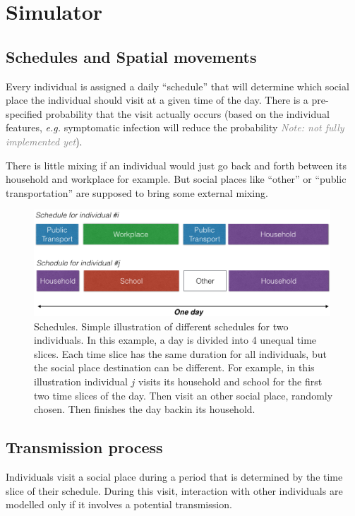 \documentclass[11pt, onecolumn]{article}
\newcommand{\note}[1]{\textit{\textcolor{Grey}{Note: #1}}}
\newcommand{\eg}{\textit{e.g.}\xspace}
\begin{document}
\section{Simulator}

\subsection{Schedules and Spatial movements}

Every individual is assigned a daily ``schedule'' that will determine which social place the individual should visit at a given time of the day. There is a pre-specified probability that the visit actually occurs (based on the individual features, \eg symptomatic infection will reduce the probability \note{not fully implemented yet}).

There is little mixing if an individual would just go back and forth between its household and workplace for example. But social places like ``other'' or ``public transportation'' are supposed to bring some external mixing.


\begin{figure}[!ht]
\centering
    \includegraphics[angle=0,width=0.99\textwidth]{figures/schedule.png}
\caption{Schedules. Simple illustration of different schedules for two individuals. In this example, a day is divided into 4 unequal time slices. Each time slice has the same duration for all individuals, but the social place destination can be different. For example, in this illustration individual $j$ visits its household and school for the first two time slices of the day. Then visit an other social place, randomly chosen. Then finishes the day backin its household.}
\label{fig:SP_indiv}
\end{figure}


\subsection{Transmission process}

Individuals visit a social place during a period that is determined by the time slice of their schedule. During this visit, interaction with other individuals are modelled only if it involves a potential transmission. 
\end{document}
